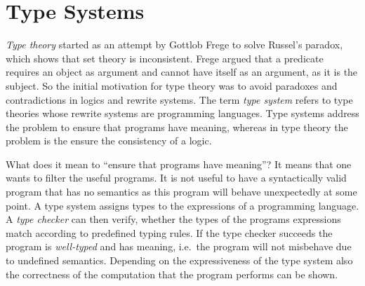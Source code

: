 \section{Type Systems}
\textit{Type theory} started as an attempt by Gottlob Frege to solve
Russel's paradox, which shows that \naive{} set theory is
inconsistent. Frege argued that a predicate requires an object as
argument and cannot have itself as an argument, as it is the
subject. So the initial motivation for type theory was to avoid
paradoxes and contradictions in logics and rewrite systems. The term
\textit{type system} refers to type theories whose rewrite systems are
programming languages. Type systems address the problem to ensure that
programs have meaning, whereas in type theory the problem is the
ensure the consistency of a logic.

What does it mean to ``ensure that programs have meaning''? It means
that one wants to filter the useful programs. It is not useful to have
a syntactically valid program that has no semantics as this program
will behave unexpectedly at some point. A type system assigns types to
the expressions of a programming language. A \textit{type checker} can
then verify, whether the types of the programs expressions match
according to predefined typing rules. If the type checker succeeds the
program is \textit{well-typed} and has meaning, i.e.\ the program will
not misbehave due to undefined semantics. Depending on the
expressiveness of the type system also the correctness of the
computation that the program performs can be shown.

